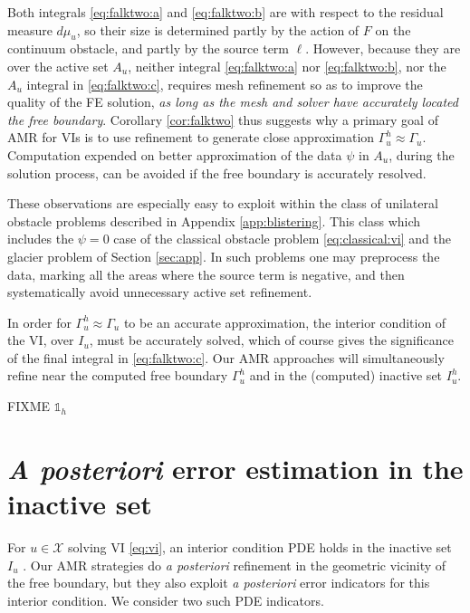 \documentclass[]{interact}
\theoremstyle{plain}%
\theoremstyle{definition}
\theoremstyle{remark}
\newcommand{\cX}{\mathcal{X}}
\begin{document}
Both integrals \eqref{eq:falktwo:a} and \eqref{eq:falktwo:b} are with respect to the residual measure $d\mu_u$, so their size is determined partly by the action of $F$ on the continuum obstacle, and partly by the source term $\ell$.  However, because they are over the active set $A_u$, neither integral \eqref{eq:falktwo:a} nor \eqref{eq:falktwo:b}, nor the $A_u$ integral in \eqref{eq:falktwo:c}, requires mesh refinement so as to improve the quality of the FE solution, \emph{as long as the mesh and solver have accurately located the free boundary}.  Corollary \ref{cor:falktwo} thus suggests why a primary goal of AMR for VIs is to use refinement to generate close approximation $\Gamma_u^h\approx \Gamma_u$.  Computation expended on better approximation of the data $\psi$ in $A_u$, during the solution process, can be avoided if the free boundary is accurately resolved.

These observations are especially easy to exploit within the class of unilateral obstacle problems described in Appendix \ref{app:blistering}.  This class which includes the $\psi=0$ case of the classical obstacle problem \eqref{eq:classical:vi} and the glacier problem of Section \ref{sec:app}.  In such problems one may preprocess the data, marking all the areas where the source term is negative, and then systematically avoid unnecessary active set refinement.

In order for $\Gamma_u^h\approx \Gamma_u$ to be an accurate approximation, the interior condition of the VI, over $I_u$, must be accurately solved, which of course gives the significance of the final integral in \eqref{eq:falktwo:c}.  Our AMR approaches will simultaneously refine near the computed free boundary $\Gamma_u^h$ and in the (computed) inactive set $I_u^h$.


\newcommand{\oneh}{\mathbb{1}_h}
FIXME $\oneh$

\section{\emph{A posteriori} error estimation in the inactive set} \label{sec:inactive}

For $u\in\cX$ solving VI \eqref{eq:vi}, an interior condition PDE holds in the inactive set $I_u$ \cite{KinderlehrerStampacchia1980}.  Our AMR strategies do \emph{a posteriori} refinement in the geometric vicinity of the free boundary, but they also exploit \emph{a posteriori} error indicators for this interior condition.  We consider two such PDE indicators.
\end{document}

